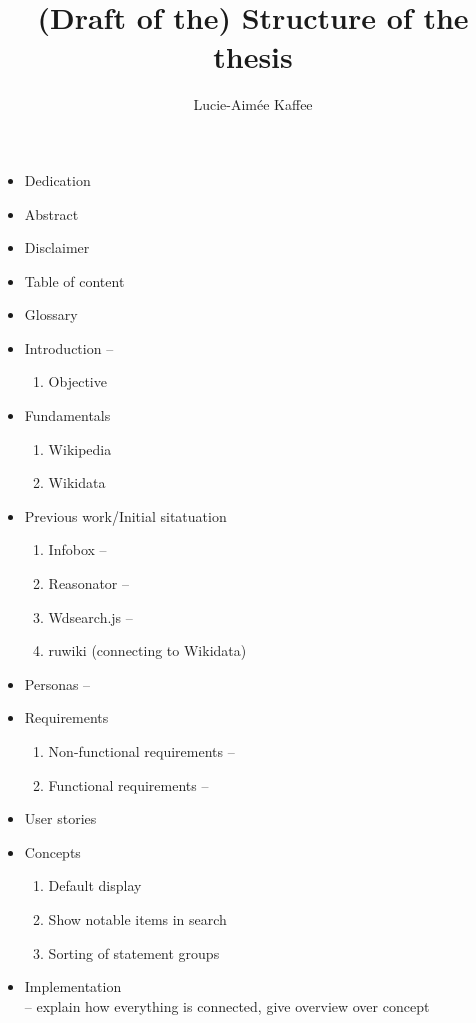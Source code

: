 \documentclass[11pt]{article}
\title {{(Draft of the) Structure of the thesis}}
\author {Lucie-Aim\'{e}e Kaffee}
\date{}
\begin{document}
  \maketitle
  \tableofcontents
  
  \begin{itemize}

  \item Dedication
  \item Abstract
  \item Disclaimer
  \item Table of content
  \item Glossary
  \item Introduction --
    \begin{enumerate}
    \item Objective
  \end{enumerate}
  \item Fundamentals
  \begin{enumerate}
    \item Wikipedia
    \item Wikidata
  \end{enumerate}
  \item Previous work/Initial sitatuation
  \begin{enumerate}
    \item Infobox --
    \item Reasonator --
    \item Wdsearch.js --
    \item ruwiki (connecting to Wikidata)
  \end{enumerate}
  \item Personas --
  \item Requirements
  \begin{enumerate}
   \item Non-functional requirements --
   \item Functional requirements -- 
  \end{enumerate}
  \item User stories
  \item Concepts
  \begin{enumerate}
	  \item Default display
	  \item Show notable items in search
	  \item Sorting of statement groups
  \end{enumerate}
  \item Implementation 
  \\ -- explain how everything is connected, give overview over concept

\end{itemize}
\end{document}
